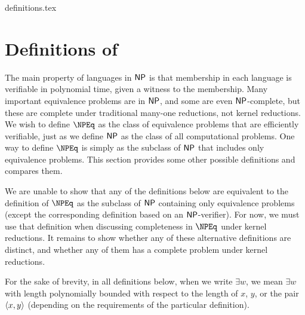 \begin{filecontents}{definitions.tex}
\section{Definitions of \texorpdfstring{\NPEq}{NPEq}}
\label{sec:definitions}
%
The main property of languages in $\NP$ is that membership in each language is verifiable in polynomial time, given a witness to the membership.
Many important equivalence problems are in $\NP$, and some are even $\NP$-complete, but these are complete under traditional many-one reductions, not kernel reductions.
We wish to define $\NPEq$ as the class of equivalence problems that are efficiently verifiable, just as we define $\NP$ as the class of all computational problems.
One way to define $\NPEq$ is simply as the subclass of $\NP$ that includes only equivalence problems.
This section provides some other possible definitions and compares them.

%
We are unable to show that any of the definitions below are equivalent to the definition of $\NPEq$ as the subclass of $\NP$ containing only equivalence problems (except the corresponding definition based on an $\NP$-verifier).
For now, we must use that definition when discussing completeness in $\NPEq$ under kernel reductions.
It remains to show whether any of these alternative definitions are distinct, and whether any of them has a complete problem under kernel reductions.

For the sake of brevity, in all definitions below, when we write $\exists w$, we mean $\exists w$ with length polynomially bounded with respect to the length of $x$, $y$, or the pair $\pair{x}{y}$ (depending on the requirements of the particular definition).


\end{filecontents}
